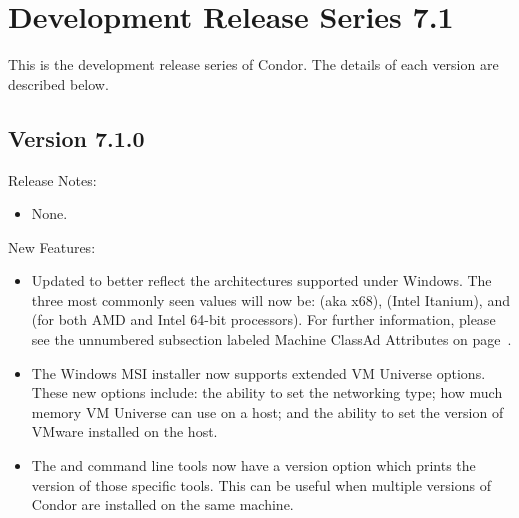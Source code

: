 
\section{\label{sec:History-7-1}Development Release Series 7.1}

This is the development release series of Condor.
The details of each version are described below.


\subsection*{\label{sec:New-7-1-0}Version 7.1.0}

\noindent Release Notes:

\begin{itemize}

\item None.

\end{itemize}


\noindent New Features:

\begin{itemize}

\item Updated  to better reflect the architectures supported 
      under Windows. The three most commonly seen values will now be: 
       (aka x68),  (Intel Itanium), and 
       (for both AMD and Intel 64-bit processors).
      For further information, please see the unnumbered subsection 
      labeled Machine ClassAd Attributes on 
      page~\pageref{sec:Machine-ClassAd-Attributes}.

\item The Windows MSI installer now supports extended VM Universe 
      options. These new options include: the ability to set the 
      networking type; how much memory VM Universe can use on a host; 
      and the ability to set the version of VMware installed on the host.

\item The  and  command line tools now have a
version option which prints the version of those specific tools.  This
can be useful when multiple versions of Condor are installed on the
same machine.

\end{itemize}

